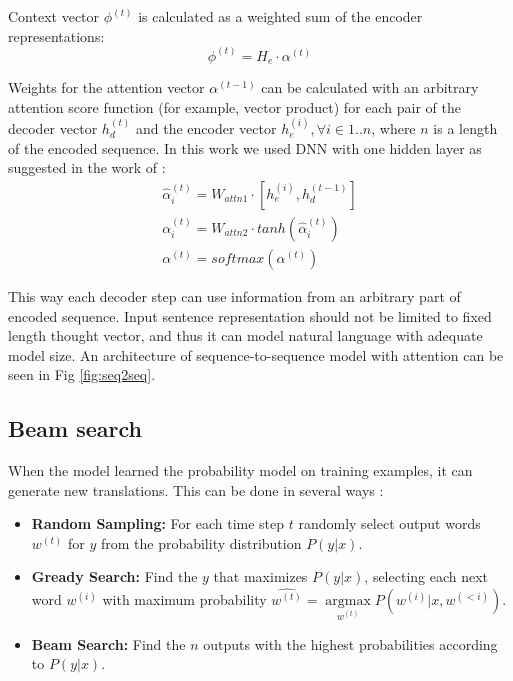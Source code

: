 Context vector $\phi^{(t)}$ is calculated as a weighted sum of the encoder representations:
\begin{equation}
	\phi^{(t)} = H_e\cdot\alpha^{(t)}
	\label{attn:phi}
\end{equation}

Weights for the attention vector $\alpha^{(t-1)}$ can be calculated with an arbitrary attention score function (for example, vector product) for each pair of the decoder vector $h_d^{(t)}$ and the encoder vector $h_e^{(i)}, \forall i \in 1..n$, where $n$ is a length of the encoded sequence. In this work we used DNN with one hidden layer as suggested in the work of \cite{Bahdanau2014}:
\begin{equation}
\begin{gathered}
\hat{\alpha}_i^{(t)} = W_{attn1} \cdot [h_e^{(i)}, h_d^{(t-1)}] \\
\alpha_i^{(t)} = W_{attn2} \cdot tanh(\hat{\alpha}_{i}^{(t)}) \\
\alpha^{(t)} = softmax(\alpha^{(t)})
\end{gathered}
\label{attn:alpha}
\end{equation}

This way each decoder step can use information from an arbitrary part of encoded sequence. Input sentence representation should not be limited to fixed length thought vector, and thus it can model natural language with adequate model size. An architecture of sequence-to-sequence model with attention can be seen in Fig \ref{fig:seq2seq}.

\subsection{Beam search} \label{beam}
When the model learned the probability model on training examples, it can generate new translations. This can be done in several ways \parencite{Neubig2017}:
        \begin{itemize}
    	\item \textbf{Random Sampling:} For each time step $t$ randomly select output words $w^{(t)}$ for $y$ from the probability distribution $P(y|x)$.
    	\item \textbf{Gready Search:} Find the $y$ that maximizes $P(y|x)$, selecting each next word $w^{(i)}$ with maximum probability $\hat{w^{(t)}} = \underset{w^{(t)}}{\operatorname{argmax}} P(w^{(i)}|x, w^{(<i)})$.
    	\item \textbf{Beam Search:} Find the $n$ outputs with the highest probabilities according to $P(y|x)$.
    \end{itemize}

